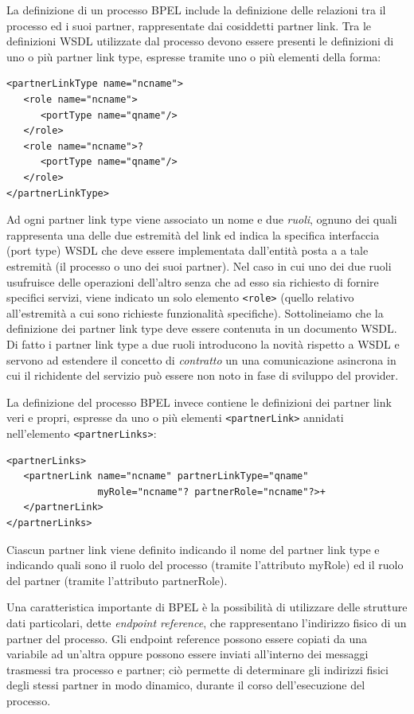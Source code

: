 La definizione di un processo BPEL include la definizione delle relazioni tra
il processo ed i suoi partner, rappresentate dai cosiddetti partner link. Tra le
definizioni WSDL utilizzate dal processo devono essere presenti le definizioni
di uno o più partner link type, espresse tramite uno o più elementi della
forma:

\begin{verbatim}
<partnerLinkType name="ncname">
   <role name="ncname">
      <portType name="qname"/>
   </role>
   <role name="ncname">?
      <portType name="qname"/>
   </role>
</partnerLinkType> 
\end{verbatim}

Ad ogni partner link type viene associato un nome e due \emph{ruoli}, ognuno dei
quali rappresenta una delle due estremità del link ed indica la specifica 
interfaccia (port type) WSDL che deve essere implementata dall'entità posta a
a tale estremità (il processo o uno dei suoi partner). Nel caso in cui uno dei
due ruoli usufruisce delle operazioni dell’altro senza che ad esso sia richiesto
di fornire specifici servizi, viene indicato un solo elemento \texttt{<role>}
(quello relativo all’estremità a cui sono richieste funzionalità specifiche).
Sottolineiamo che  la definizione dei partner link type deve essere contenuta
in un documento WSDL. Di fatto i partner link type a due ruoli introducono la
novità rispetto a WSDL e servono ad estendere il concetto di
\emph{contratto} un una comunicazione asincrona in cui il richidente del
servizio può essere non noto in fase di sviluppo del provider.

La definizione del processo BPEL invece contiene le definizioni dei partner
link veri e propri, espresse da uno o più elementi \texttt{<partnerLink>}
annidati nell’elemento \texttt{<partnerLinks>}:

\begin{verbatim}
<partnerLinks>
   <partnerLink name="ncname" partnerLinkType="qname"
                myRole="ncname"? partnerRole="ncname"?>+
   </partnerLink>
</partnerLinks>
\end{verbatim}

Ciascun partner link viene definito indicando il nome del partner link type e
indicando quali sono il ruolo del processo (tramite l'attributo myRole) ed il
ruolo del partner (tramite l’attributo partnerRole).


Una caratteristica importante di BPEL è la possibilità di utilizzare delle
strutture dati particolari, dette \emph{endpoint reference}, che rappresentano
l'indirizzo fisico di un partner del processo. Gli endpoint reference possono
essere copiati da una variabile ad un'altra oppure possono essere inviati
all'interno dei messaggi trasmessi tra processo e partner; ciò permette di
determinare gli indirizzi fisici degli stessi partner in modo dinamico, durante il corso
dell'esecuzione del processo.

